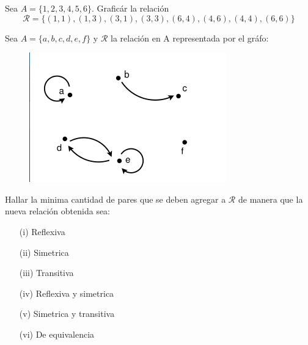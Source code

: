 \documentclass[10pt]{article}
\begin{document}
\begin{ej}
Sea $A = \{ 1,2,3,4,5,6 \}$. Graficár la relación
$$\mathcal{R} = \{ (1,1), (1,3), (3,1), (3,3), (6,4), (4, 6), (4, 4), (6, 6) \}$$
\end{ej}

\begin{ej}
Sea $A = \{a,b,c,d,e,f \}$ y $\mathcal{R}$ la relación en A  representada por el gráfo:
\begin{figure}[H]
	\centering
	 \includegraphics[scale=0.7]{figuras/relaciones/img3.png}
\end{figure}
Hallar la minima cantidad de pares que se deben agregar a $\mathcal{R}$ de manera que la nueva relación obtenida sea:
\begin{itemize}
	\item[(i)] Reflexiva
	\item[(ii)] Simetrica
	\item[(iii)] Transitiva
	\item[(iv)] Reflexiva y simetrica
	\item[(v)] Simetrica y transitiva
	\item[(vi)] De equivalencia
\end{itemize}
\end{ej}
\end{document}
